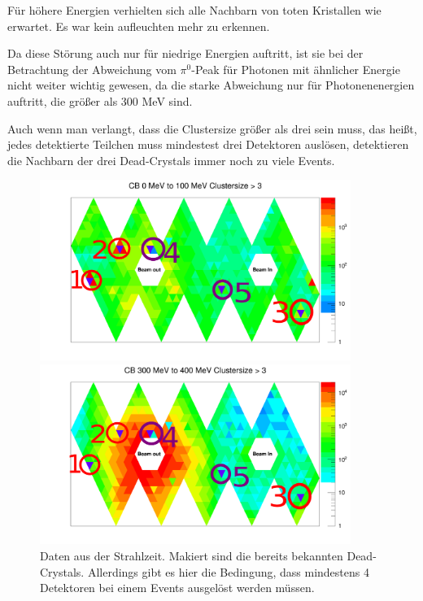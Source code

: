 \documentclass[a4paper,11pt,oneside,final,german,openbib,pdftex]{scrbook}
\begin{document}
{\begin{figure}[h!]
\end{figure}

F\"ur h\"ohere Energien verhielten sich alle Nachbarn von toten Kristallen wie erwartet. Es war kein aufleuchten mehr zu erkennen.

Da diese St\"orung auch nur f\"ur niedrige Energien auftritt, ist sie bei der Betrachtung der Abweichung vom $\pi^0$-Peak f\"ur Photonen mit \"ahnlicher Energie nicht weiter wichtig gewesen, da die starke Abweichung nur f\"ur Photonenenergien auftritt, die gr\"o{\ss}er als 300 MeV sind.

Auch wenn man verlangt, dass die Clustersize gr\"o{\ss}er als drei sein muss, das hei{\ss}t, jedes detektierte Teilchen muss mindestest drei Detektoren ausl\"osen, detektieren die Nachbarn der drei Dead-Crystals immer noch zu viele Events.



\begin{figure}[h!]
	\centering
	\begin{minipage}{0.45\textwidth}
		\centering
		\includegraphics[width=0.9\textwidth]{NewCalib/Strahlzeit2014/ClusterSizeNew/20172404Clustersize3Map100MeV}
		
	\end{minipage}
	\hfill
	\begin{minipage}{0.45\textwidth}
		\centering
		\includegraphics[width=0.9\textwidth]{NewCalib/Strahlzeit2014/ClusterSizeNew/20172404Clustersize3Map400MeV}
	\end{minipage}
	\caption[Strahlzeit: Symmetrische Photonen; Markierte Dead-Crystals; Clustersize $>$ 3]{Daten aus der Strahlzeit. Makiert sind die bereits bekannten Dead-Crystals. Allerdings gibt es hier die Bedingung, dass mindestens 4 Detektoren bei einem Events ausgel\"ost werden m\"ussen.}
	

\end{figure}}
\end{document}
